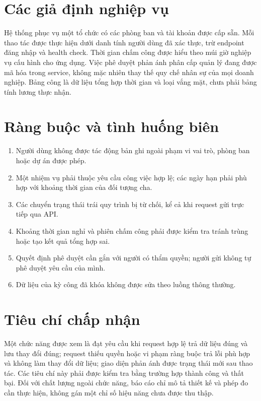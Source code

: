\documentclass[12pt,a4paper,oneside]{report}
\begin{document}
\section{Các giả định nghiệp vụ}
Hệ thống phục vụ một tổ chức có các phòng ban và tài khoản được cấp sẵn. Mỗi thao tác được thực hiện dưới danh tính người dùng đã xác thực, trừ endpoint đăng nhập và health check. Thời gian chấm công được hiểu theo múi giờ nghiệp vụ cấu hình cho ứng dụng. Việc phê duyệt phản ánh phân cấp quản lý đang được mã hóa trong service, không mặc nhiên thay thế quy chế nhân sự của mọi doanh nghiệp. Bảng công là dữ liệu tổng hợp thời gian và loại vắng mặt, chưa phải bảng tính lương thực nhận.

\section{Ràng buộc và tình huống biên}
\begin{enumerate}
\item Người dùng không được tác động bản ghi ngoài phạm vi vai trò, phòng ban hoặc dự án được phép.
\item Một nhiệm vụ phải thuộc yêu cầu công việc hợp lệ; các ngày hạn phải phù hợp với khoảng thời gian của đối tượng cha.
\item Các chuyển trạng thái trái quy trình bị từ chối, kể cả khi request gửi trực tiếp qua API.
\item Khoảng thời gian nghỉ và phiên chấm công phải được kiểm tra tránh trùng hoặc tạo kết quả tổng hợp sai.
\item Quyết định phê duyệt cần gắn với người có thẩm quyền; người gửi không tự phê duyệt yêu cầu của mình.
\item Dữ liệu của kỳ công đã khóa không được sửa theo luồng thông thường.
\end{enumerate}

\section{Tiêu chí chấp nhận}
Một chức năng được xem là đạt yêu cầu khi request hợp lệ trả dữ liệu đúng và lưu thay đổi đúng; request thiếu quyền hoặc vi phạm ràng buộc trả lỗi phù hợp và không làm thay đổi dữ liệu; giao diện phản ánh được trạng thái mới sau thao tác. Các tiêu chí này phải được kiểm tra bằng trường hợp thành công và thất bại. Đối với chất lượng ngoài chức năng, báo cáo chỉ mô tả thiết kế và phép đo cần thực hiện, không gán một chỉ số hiệu năng chưa được thu thập.
\end{document}
